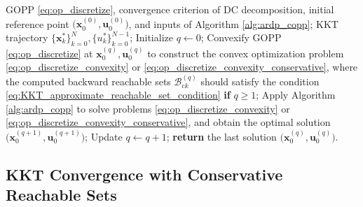 \documentclass[journal]{IEEEtran}
\theoremstyle{definition}
\theoremstyle{definition}
\renewcommand\vector[1]{\boldsymbol{#1}}
\newcommand\vx{{\vector{x}}}
\newcommand\bx{{\mathbf{x}}}
\newcommand\bu{{\mathbf{u}}}
\begin{document}
\begin{algorithm}[!t]
    \caption{RDDP for GOPP.}
    \label{alg:ardp_gopp}
    \begin{algorithmic}[1]
        \REQUIRE GOPP \eqref{eq:op_discretize}, convergence criterion of DC decomposition, initial reference point $\Big(\bx_0^{(0)}, \bu_0^{(0)}\Big)$, and inputs of Algorithm \ref{alg:ardp_copp};
        \ENSURE KKT trajectory $\{\vx_k^*\}_{k=0}^{N}, \{u_k^*\}_{k=0}^{N-1}$;
        \STATE Initialize $q\leftarrow 0$;
        \REPEAT
            \STATE Convexify GOPP \eqref{eq:op_discretize} at $\bx_0^{(q)},\bu_0^{(q)}$ to construct the convex optimization problem \eqref{eq:op_discretize_convexity} or \eqref{eq:op_discretize_convexity_conservative}, where the computed backward reachable sets $\mathcal{B}_{\text{c}k}^{(q)}$ should satisfy the condition \eqref{eq:KKT_approximate_reachable_set_condition} \textbf{if} $q\geq1$;
            \STATE Apply Algorithm \ref{alg:ardp_copp} to solve problems \eqref{eq:op_discretize_convexity} or \eqref{eq:op_discretize_convexity_conservative}, and obtain the optimal solution $\Big(\bx_0^{(q+1)}, \bu_0^{(q+1)}\Big)$;
            \STATE Update $q\leftarrow q+1$;
        \STATE \textbf{return} the last solution $\Big(\bx_0^{(q)}, \bu_0^{(q)}\Big)$.
    \end{algorithmic}
\end{algorithm}

\subsection{KKT Convergence with Conservative Reachable Sets}\label{subsec:KKT_GOPP_Conservative}
\end{document}
